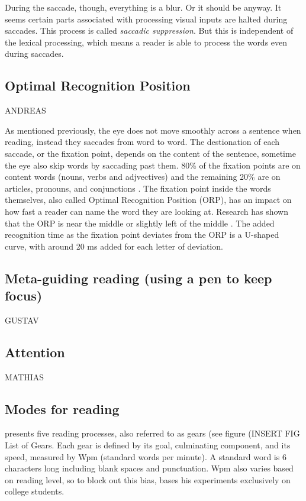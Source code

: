 During the saccade, though, everything is a blur. Or it should be anyway. It seems certain parts associated with processing visual inputs are halted during saccades. This process is called \textit{saccadic suppression}. But this is independent of the lexical processing, which means a reader is able to process the words even during saccades.

\subsection{Optimal Recognition Position} \label{ORP}
ANDREAS

As mentioned previously, the eye does not move smoothly across a sentence when reading, instead they saccades from word to word. The destionation of each saccade, or the fixation point, depends on the content of the sentence, sometime the eye also skip words by saccading past them. 80\% of the fixation points are on content words (nouns, verbs and adjvectives) and the remaining 20\% are on articles, pronouns, and conjunctions \cite{eysenck_cognitive_2010}. The fixation point inside the words themselves, also called Optimal Recognition Position (ORP), has an impact on how fast a reader can name the word they are looking at. Research has shown that the ORP is near the middle or slightly left of the middle \cite{oregan_optimal_1992, nazir_letter_1998, oregan_convenient_1984}. The added recognition time as the fixation point deviates from the ORP is a U-shaped curve, with around 20 ms added for each letter of deviation.


\subsection{Meta-guiding reading (using a pen to keep focus)}
GUSTAV

\subsection{Attention}
MATHIAS

\subsection{Modes for reading}
\cite{carver_reading_1992} presents five reading processes, also referred to as gears (see figure (INSERT FIG List of Gears. Each gear is defined by its goal, culminating component, and its speed, measured by Wpm (standard words per minute). A standard word is 6 characters long including blank spaces and punctuation. Wpm also varies based on reading level, so to block out this bias, \cite{carver_reading_1992} bases his experiments exclusively on college students.

